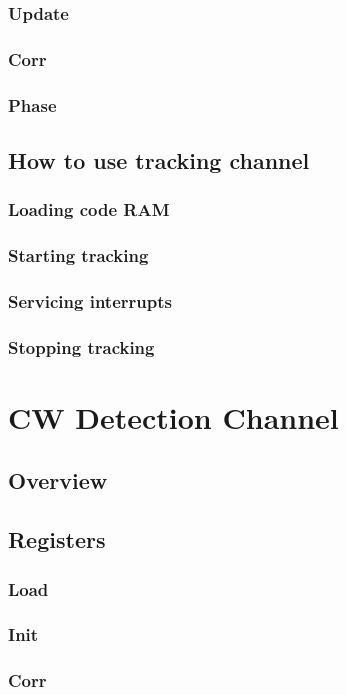 \documentclass{article}
\begin{document}
\begin{multicols}{2}
\subsubsection{Update}
\subsubsection{Corr}
\subsubsection{Phase}
\subsection{How to use tracking channel}
\subsubsection{Loading code RAM}
\subsubsection{Starting tracking}
\subsubsection{Servicing interrupts}
\subsubsection{Stopping tracking}

\hypertarget{cwlink}{}
\section{CW Detection Channel}
\subsection{Overview}
\subsection{Registers}
\subsubsection{Load}
\subsubsection{Init}
\subsubsection{Corr}

\end{multicols}
\end{document}
